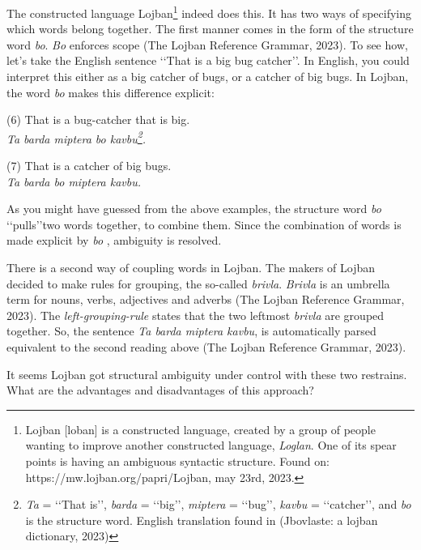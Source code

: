 The constructed language Lojban\footnote{Lojban [lo\textyogh ban] is a constructed language, created by a group of people wanting to improve another constructed language, {\it Loglan}. One of its spear points is having an ambiguous syntactic structure. Found  on: https://mw.lojban.org/papri/Lojban, may 23rd, 2023.} indeed does this. It has two ways of specifying which words belong together. The first manner comes in the form of the structure word {\it bo}. \def\bo{{\it bo} } {\it Bo} enforces scope (The Lojban Reference Grammar, 2023). To see how, let's take the English sentence \lq\lq That is a big bug catcher\rq\rq. In English, you could interpret this either as a big catcher of bugs, or a catcher of big bugs. In Lojban, the word \bo makes this difference explicit:


\begin{center}
	{\center (6) That is a bug-catcher that is big.\\ {\it Ta barda miptera bo kavbu\footnote{{\it Ta} = \lq\lq That is\rq\rq, {\it barda} = \lq\lq big\rq\rq, {\it miptera} = \lq\lq bug\rq\rq, {\it kavbu} = \lq\lq catcher\rq\rq, and \bo is the structure word. English translation found  in  (Jbovlaste: a lojban dictionary, 2023)}.}}

{\center (7) That is a catcher of big bugs. \\}
{\it Ta barda bo miptera kavbu.}
\end{center}
\vspace{0.1cm}

\noindent As you might have guessed from the above examples, the structure word \bo \lq\lq pulls\rq\rq two words together, to combine them. Since the combination of words is made explicit by \bo, ambiguity is resolved. 

There is a second way of coupling words in Lojban. The makers of Lojban decided to make rules for grouping, the so-called {\it brivla}. {\it Brivla} is an umbrella term for nouns, verbs, adjectives and adverbs (The Lojban Reference Grammar, 2023). The {\it left-grouping-rule} states that the two leftmost {\it brivla} are grouped together. So, the sentence {\it Ta barda miptera kavbu}, is automatically parsed equivalent to the second reading above (The Lojban Reference Grammar, 2023). 

It seems Lojban got structural ambiguity under control with these two restrains. What are the advantages and disadvantages of this approach?

